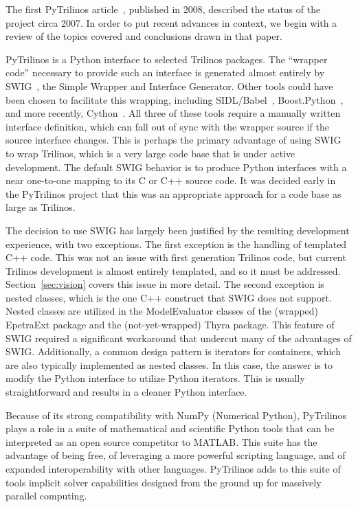 \documentclass[11pt]{article}
\begin{document}
The first PyTrilinos article~\cite{PyTrilinos}, published in 2008, described the status of the project circa 2007.  In order to put recent advances in context, we begin with a review of the topics covered and conclusions drawn in that paper.

PyTrilinos is a Python interface to selected Trilinos packages.  The ``wrapper code'' necessary to provide such an interface is generated almost entirely by SWIG~\cite{SWIG_CXX_Python}, the Simple Wrapper and Interface Generator.  Other tools could have been chosen to facilitate this wrapping, including SIDL/Babel~\cite{Babel}, Boost.Python~\cite{BoostPython}, and more recently, Cython~\cite{Cython}.  All three of these tools require a manually written interface definition, which can fall out of sync with the wrapper source if the source interface changes.  This is perhaps the primary advantage of using SWIG to wrap Trilinos, which is a very large code base that is under active development.  The default SWIG behavior is to produce Python interfaces with a near one-to-one mapping to its C or C++ source code.  It was decided early in the PyTrilinos project that this was an appropriate approach for a code base as large as Trilinos.

The decision to use SWIG has largely been justified by the resulting development experience, with two exceptions.  The first exception is the handling of templated C++ code.  This was not an issue with first generation Trilinos code, but current Trilinos development is almost entirely templated, and so it must be addressed.  Section~\ref{sec:vision} covers this issue in more detail.  The second exception is nested classes, which is the one C++ construct that SWIG does not support.  Nested classes are utilized in the ModelEvaluator classes of the (wrapped) EpetraExt package and the (not-yet-wrapped) Thyra package.  This feature of SWIG required a significant workaround that undercut many of the advantages of SWIG.  Additionally, a common design pattern is iterators for containers, which are also typically implemented as nested classes.  In this case, the answer is to modify the Python interface to utilize Python iterators.  This is usually straightforward and results in a cleaner Python interface.

Because of its strong compatibility with NumPy (Numerical Python), PyTrilinos plays a role in a suite of mathematical and scientific Python tools that can be interpreted as an open source competitor to MATLAB.  This suite has the advantage of being free, of leveraging a more powerful scripting language, and of expanded interoperability with other languages.  PyTrilinos adds to this suite of tools implicit solver capabilities designed from the ground up for massively parallel computing.
\end{document}

